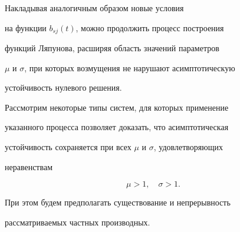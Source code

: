  


\begin{note} Накладывая аналогичным образом новые условия 


на функции $b_{sj}(t)$, можно продолжить процесс построения 


функций Ляпунова, расширяя область значений параметров 


$\mu$ и $\sigma$, при которых возмущения не нарушают асимптотическую 


устойчивость нулевого решения. 


\end{note} 


 


Рассмотрим некоторые типы систем, для которых применение 


указанного процесса позволяет доказать, что асимптотическая 


устойчивость сохраняется при всех $\mu$ и $\sigma$, удовлетворяющих 


неравенствам 


\begin{equation} 


\mu>1,\quad \sigma>1. 


\end{equation} 


При этом будем предполагать существование и непрерывность 


рассматриваемых частных производных. 


 


